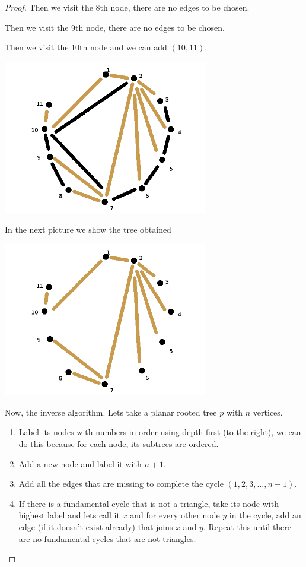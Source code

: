 \begin{proof}
    Then we visit the 8th node, there are no edges to be chosen.\pn
    
    Then we visit the 9th node, there are no edges to be chosen.\pn
    
    Then we visit the 10th node and we can add $(10, 11)$.\pn
    \begin{center}
        \includegraphics[width=9cm]{Homework1/Problem4/TriangulationToPlanarRootedTree6.png}
    \end{center}
    
    In the next picture we show the tree obtained
    \begin{center}
        \includegraphics[width=9cm]{Homework1/Problem4/TriangulationToPlanarRootedTree7.png}
    \end{center}
    
    Now, the inverse algorithm. Lets take a planar rooted tree $p$ with $n$ vertices. 
    \begin{enumerate}
        \item 
            Label its nodes with numbers in order using depth first (to the right), we can do
            this because for each node, its subtrees are ordered.
        \item
            Add a new node and label it with $n+1$.
        \item
            Add all the edges that are missing to complete the cycle $(1, 2, 3, \dots, n+1)$.
        \item
            If there is a fundamental cycle that is not a triangle, take its node with highest label and lets call it $x$ and
            for every other node $y$ in the cycle, add an edge (if it doesn't exist already) that joins $x$ and $y$. Repeat this
            until there are no fundamental cycles that are not triangles.
    \end{enumerate}
    
\end{proof}